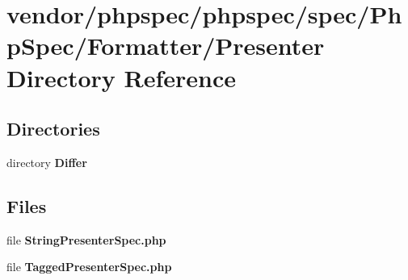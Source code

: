 \section{vendor/phpspec/phpspec/spec/\+Php\+Spec/\+Formatter/\+Presenter Directory Reference}
\label{dir_a2eab17d1a54a8f7602911333c77ead3}
\subsection*{Directories}
\begin{DoxyCompactItemize}
\item 
directory {\bf Differ}
\end{DoxyCompactItemize}
\subsection*{Files}
\begin{DoxyCompactItemize}
\item 
file {\bf String\+Presenter\+Spec.\+php}
\item 
file {\bf Tagged\+Presenter\+Spec.\+php}
\end{DoxyCompactItemize}
